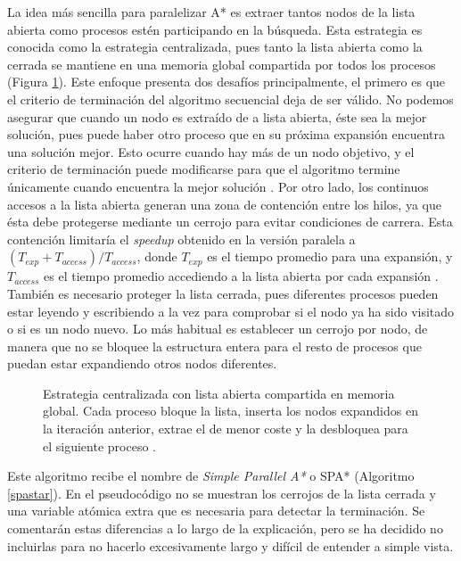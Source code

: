 \documentclass[a4paper,12pt]{article}
\begin{document}
La idea más sencilla para paralelizar A* es extraer tantos nodos de la lista abierta como procesos estén participando en la búsqueda. Esta estrategia es conocida como la estrategia centralizada, pues tanto la lista abierta como la cerrada se mantiene en una memoria global compartida por todos los procesos (Figura \ref{fig:centralizado}). Este enfoque presenta dos desafíos principalmente, el primero es que el criterio de terminación del algoritmo secuencial deja de ser válido. No podemos asegurar que cuando un nodo es extraído de a lista abierta, éste sea la mejor solución, pues puede haber otro proceso que en su próxima expansión encuentra una solución mejor. Esto ocurre cuando hay más de un nodo objetivo, y el criterio de terminación puede modificarse para que el algoritmo termine únicamente cuando encuentra la mejor solución \cite{leifker1984hybrid}. Por otro lado, los continuos accesos a la lista abierta generan una zona de contención entre los hilos, ya que ésta debe protegerse mediante un cerrojo para evitar condiciones de carrera. Esta contención limitaría el \textit{speedup} obtenido en la versión paralela a $(T_{exp} + T_{access})/T_{access}$, donde $T_{exp}$ es el tiempo promedio para una expansión, y $T_{access}$ es el tiempo promedio accediendo a la lista abierta por cada expansión \cite{huang1987tight}. También es necesario proteger la lista cerrada, pues diferentes procesos pueden estar leyendo y escribiendo a la vez para comprobar si el nodo ya ha sido visitado o si es un nodo nuevo. Lo más habitual es establecer un cerrojo por nodo, de manera que no se bloquee la estructura entera para el resto de procesos que puedan estar expandiendo otros nodos diferentes.

\begin{figure}[H]
    \centering
    
    \caption{Estrategia centralizada con lista abierta compartida en memoria global. Cada proceso bloque la lista, inserta los nodos expandidos en la iteración anterior, extrae el de menor coste y la desbloquea para el siguiente proceso \cite{grama1995parallel}.}
    \label{fig:centralizado}
\end{figure}

Este algoritmo recibe el nombre de \textit{Simple Parallel A*} o SPA* (Algoritmo \ref{spastar}). En el pseudocódigo no se muestran los cerrojos de la lista cerrada y una variable atómica extra que es necesaria para detectar la terminación. Se comentarán estas diferencias a lo largo de la explicación, pero se ha decidido no incluirlas para no hacerlo excesivamente largo y difícil de entender a simple vista.
\end{document}

